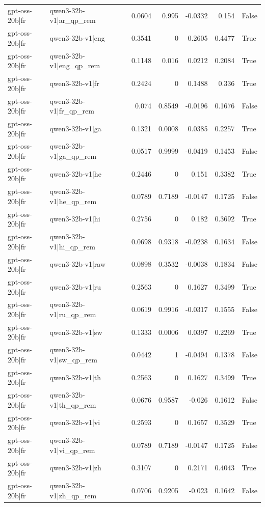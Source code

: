 \begin{table}
\begin{tabular}{l l r r r r l}
gpt-oss-20b|fr & qwen3-32b-v1|ar_qp_rem & 0.0604 & 0.995 & -0.0332 & 0.154 & False \\
gpt-oss-20b|fr & qwen3-32b-v1|eng & 0.3541 & 0 & 0.2605 & 0.4477 & True \\
gpt-oss-20b|fr & qwen3-32b-v1|eng_qp_rem & 0.1148 & 0.016 & 0.0212 & 0.2084 & True \\
gpt-oss-20b|fr & qwen3-32b-v1|fr & 0.2424 & 0 & 0.1488 & 0.336 & True \\
gpt-oss-20b|fr & qwen3-32b-v1|fr_qp_rem & 0.074 & 0.8549 & -0.0196 & 0.1676 & False \\
gpt-oss-20b|fr & qwen3-32b-v1|ga & 0.1321 & 0.0008 & 0.0385 & 0.2257 & True \\
gpt-oss-20b|fr & qwen3-32b-v1|ga_qp_rem & 0.0517 & 0.9999 & -0.0419 & 0.1453 & False \\
gpt-oss-20b|fr & qwen3-32b-v1|he & 0.2446 & 0 & 0.151 & 0.3382 & True \\
gpt-oss-20b|fr & qwen3-32b-v1|he_qp_rem & 0.0789 & 0.7189 & -0.0147 & 0.1725 & False \\
gpt-oss-20b|fr & qwen3-32b-v1|hi & 0.2756 & 0 & 0.182 & 0.3692 & True \\
gpt-oss-20b|fr & qwen3-32b-v1|hi_qp_rem & 0.0698 & 0.9318 & -0.0238 & 0.1634 & False \\
gpt-oss-20b|fr & qwen3-32b-v1|raw & 0.0898 & 0.3532 & -0.0038 & 0.1834 & False \\
gpt-oss-20b|fr & qwen3-32b-v1|ru & 0.2563 & 0 & 0.1627 & 0.3499 & True \\
gpt-oss-20b|fr & qwen3-32b-v1|ru_qp_rem & 0.0619 & 0.9916 & -0.0317 & 0.1555 & False \\
gpt-oss-20b|fr & qwen3-32b-v1|sw & 0.1333 & 0.0006 & 0.0397 & 0.2269 & True \\
gpt-oss-20b|fr & qwen3-32b-v1|sw_qp_rem & 0.0442 & 1 & -0.0494 & 0.1378 & False \\
gpt-oss-20b|fr & qwen3-32b-v1|th & 0.2563 & 0 & 0.1627 & 0.3499 & True \\
gpt-oss-20b|fr & qwen3-32b-v1|th_qp_rem & 0.0676 & 0.9587 & -0.026 & 0.1612 & False \\
gpt-oss-20b|fr & qwen3-32b-v1|vi & 0.2593 & 0 & 0.1657 & 0.3529 & True \\
gpt-oss-20b|fr & qwen3-32b-v1|vi_qp_rem & 0.0789 & 0.7189 & -0.0147 & 0.1725 & False \\
gpt-oss-20b|fr & qwen3-32b-v1|zh & 0.3107 & 0 & 0.2171 & 0.4043 & True \\
gpt-oss-20b|fr & qwen3-32b-v1|zh_qp_rem & 0.0706 & 0.9205 & -0.023 & 0.1642 & False \\

\end{tabular}
\end{table}
